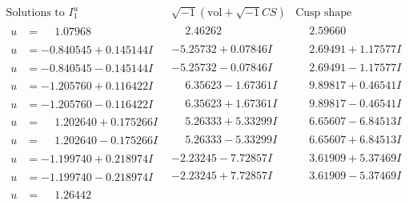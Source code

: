 \documentclass[1p]{elsarticle_modified}
\theoremstyle{definition}
\newcommand{\I}{\sqrt{-1}}
\begin{document}
$$\begin{array}{c|c|c}  
\text{Solutions to }I^u_{1}& \I (\text{vol} + \sqrt{-1}CS) & \text{Cusp shape}\\
 \hline 
\begin{aligned}
u &= \phantom{-}1.07968\phantom{ +0.000000I}\end{aligned}
 & \phantom{-}2.46262\phantom{ +0.000000I} & \phantom{-}2.59660\phantom{ +0.000000I} \\ \hline\begin{aligned}
u &= -0.840545 + 0.145144 I\end{aligned}
 & -5.25732 + 0.07846 I & \phantom{-}2.69491 + 1.17577 I \\ \hline\begin{aligned}
u &= -0.840545 - 0.145144 I\end{aligned}
 & -5.25732 - 0.07846 I & \phantom{-}2.69491 - 1.17577 I \\ \hline\begin{aligned}
u &= -1.205760 + 0.116422 I\end{aligned}
 & \phantom{-}6.35623 - 1.67361 I & \phantom{-}9.89817 + 0.46541 I \\ \hline\begin{aligned}
u &= -1.205760 - 0.116422 I\end{aligned}
 & \phantom{-}6.35623 + 1.67361 I & \phantom{-}9.89817 - 0.46541 I \\ \hline\begin{aligned}
u &= \phantom{-}1.202640 + 0.175266 I\end{aligned}
 & \phantom{-}5.26333 + 5.33299 I & \phantom{-}6.65607 - 6.84513 I \\ \hline\begin{aligned}
u &= \phantom{-}1.202640 - 0.175266 I\end{aligned}
 & \phantom{-}5.26333 - 5.33299 I & \phantom{-}6.65607 + 6.84513 I \\ \hline\begin{aligned}
u &= -1.199740 + 0.218974 I\end{aligned}
 & -2.23245 - 7.72857 I & \phantom{-}3.61909 + 5.37469 I \\ \hline\begin{aligned}
u &= -1.199740 - 0.218974 I\end{aligned}
 & -2.23245 + 7.72857 I & \phantom{-}3.61909 - 5.37469 I \\ \hline\begin{aligned}
u &= \phantom{-}1.26442\phantom{ +0.000000I}\end{aligned}

\end{array}$$
\end{document}
